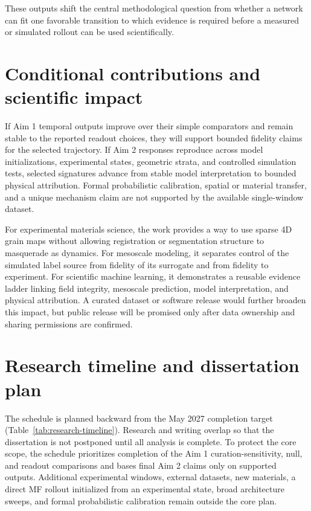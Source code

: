 \documentclass[proposalMode]{ufdissertation}
\begin{document}
These outputs shift the central methodological question from whether a network can fit one favorable transition to which evidence is required before a measured or simulated rollout can be used scientifically.

\section{Conditional contributions and scientific impact}

If Aim 1 temporal outputs improve over their simple comparators and remain stable to the reported readout choices, they will support bounded fidelity claims for the selected trajectory. If Aim 2 responses reproduce across model initializations, experimental states, geometric strata, and controlled simulation tests, selected signatures advance from stable model interpretation to bounded physical attribution. Formal probabilistic calibration, spatial or material transfer, and a unique mechanism claim are not supported by the available single-window dataset.

For experimental materials science, the work provides a way to use sparse 4D grain maps without allowing registration or segmentation structure to masquerade as dynamics. For mesoscale modeling, it separates control of the simulated label source from fidelity of its surrogate and from fidelity to experiment. For scientific machine learning, it demonstrates a reusable evidence ladder linking field integrity, mesoscale prediction, model interpretation, and physical attribution. A curated dataset or software release would further broaden this impact, but public release will be promised only after data ownership and sharing permissions are confirmed.


\section{Research timeline and dissertation plan}

The schedule is planned backward from the May 2027 completion target (Table~\ref{tab:research-timeline}). Research and writing overlap so that the dissertation is not postponed until all analysis is complete.
To protect the core scope, the schedule prioritizes completion of the Aim 1 curation-sensitivity, null, and readout comparisons and bases final Aim 2 claims only on supported outputs. Additional experimental windows, external datasets, new materials, a direct MF rollout initialized from an experimental state, broad architecture sweeps, and formal probabilistic calibration remain outside the core plan.
\end{document}
